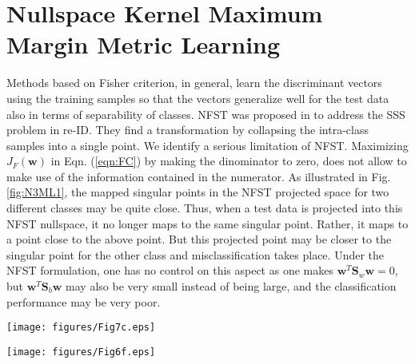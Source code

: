 \documentclass[runningheads]{llncs}
\begin{document}
\section{Nullspace Kernel Maximum Margin Metric Learning}
\label{sec:NK3ML}
Methods based on Fisher criterion, in general, learn the discriminant vectors using the training samples so that the vectors generalize well for the test data also in terms of separability of classes. NFST\cite{guo:nfst,bodesheim:novelty} was proposed in \cite{Zheng:nfst} to address the SSS problem in re-ID. They find a transformation by collapsing the intra-class samples into a single point. We identify a serious limitation of NFST. Maximizing $J_F(\mathbf{w})$ in Eqn. (\ref{eqn:FC}) by making the dinominator to zero, does not allow to make use of the information contained in the numerator. As illustrated in Fig. \ref{fig:N3ML1},  the mapped singular points in the NFST projected space for two different classes may be quite close. Thus, when a test data is projected into this NFST nullspace, it no longer maps to the same singular point. Rather, it maps to a point close to the above point. But this projected point may be closer to the singular point for the other class and misclassification takes place. Under the NFST formulation, one has no control on this aspect as one makes $\mathbf{w}^T\mathbf{S}_w \mathbf{w} = 0$, but $\mathbf{w}^T\mathbf{S}_b \mathbf{w}$ may also be very small instead of being large, and the classification performance may be very poor.

\begin{figure*}[t!]
\begin{center}
   \texttt{[image: figures/Fig7c.eps]}
\end{center}
   \caption{Illustration of the suboptimality in NFST. Each color corresponds to distinct classes.}
\label{fig:N3ML1}
\end{figure*}

\begin{figure*}[t]
\begin{center}
   \texttt{[image: figures/Fig6f.eps]}
\end{center}
   \caption{Illustration of our method NK3ML. Each color corresponds to distinct classes.}
\label{fig:N3ML2}
\end{figure*}
\end{document}
